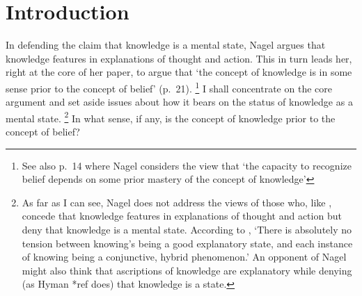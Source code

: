 \documentclass[11pt,a4paper]{extarticle}
\begin{document}
\setlength\footnotesep{1em}




\maketitle

\begin{abstract}
\noindent
***


\end{abstract}



\section{Introduction}
In defending the claim that knowledge is a mental state, Nagel argues that knowledge features in explanations of thought and action.
This in turn leads her, right at the core of her paper, to argue that  `the concept of knowledge is in some sense prior to the concept of belief' (p.\ 21).%
\footnote{
See also p.\ 14 where Nagel considers the view that `the capacity to recognize belief depends on some prior mastery of the concept of knowledge'
}
I shall concentrate on the core argument and set aside issues about how it bears on the status of knowledge as a mental state.%
\footnote{
As far as I can see, Nagel does not address the views of those who, like \citet{fricker_2009}, concede that knowledge features in explanations of thought and action but deny that knowledge is a mental state.
According to \citet[p.\ 51]{fricker_2009}, `There is absolutely no tension between knowing's being a good explanatory state, and each instance of knowing being a conjunctive, hybrid phenomenon.'
An opponent of Nagel might also think that ascriptions of knowledge are explanatory while denying (as Hyman *ref does) that knowledge is a state.
}
In what sense, if any, is the concept of knowledge prior to the concept of belief?
\end{document}
